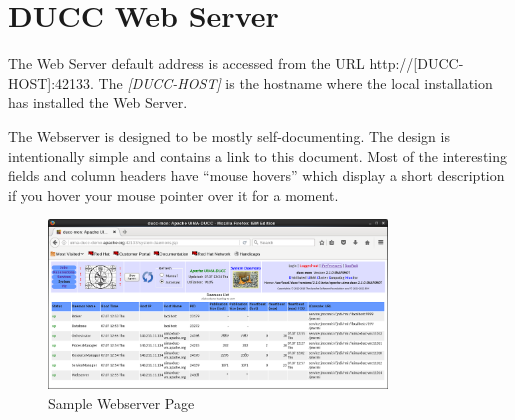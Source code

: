 % 
% 
% 
% 
\ifpdf
\else
{}
\fi
\chapter{DUCC Web Server}

    The {\DUCC} Web Server default address is accessed from the URL http://[DUCC-HOST]:42133.  The
    {\em[DUCC-HOST]} is the hostname where the local installation has installed the {\DUCC}
    Web Server.
    
  \begin{center}     
  \end{center}
  
    The Webserver is designed to be mostly self-documenting. The design is intentionally simple 
    and contains a link to this document.  Most of the interesting fields and column headers
    have ``mouse hovers'' which display a short 
    description if you hover your mouse pointer over it for a moment.

\begin{figure}[ht!]
\centering
\includegraphics[width=90mm]{images/ducc-webserver/System-Daemons.png}
\caption{Sample Webserver Page}
\end{figure}

